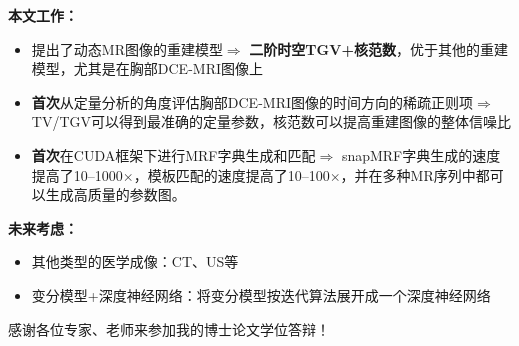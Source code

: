 \documentclass{beamer}
\begin{document}
\begin{frame}
\end{frame}

\begin{frame}
	\textbf{本文工作：}
	\begin{itemize}
		\item 提出了动态MR图像的重建模型$\Rightarrow$ \textbf{二阶时空TGV+核范数}，优于其他的重建模型，尤其是在胸部DCE-MRI图像上
		\item \textbf{首次}从定量分析的角度评估胸部DCE-MRI图像的时间方向的稀疏正则项$\Rightarrow$ TV/TGV可以得到最准确的定量参数，核范数可以提高重建图像的整体信噪比
		\item \textbf{首次}在CUDA框架下进行MRF字典生成和匹配$\Rightarrow$ snapMRF字典生成的速度提高了10--1000$\times$，模板匹配的速度提高了10--100$\times$，并在多种MR序列中都可以生成高质量的参数图。
	\end{itemize}
	
	\textbf{未来考虑：}
	\begin{itemize}
		\item 其他类型的医学成像：CT、US等
		\item 变分模型+深度神经网络：将变分模型按迭代算法展开成一个深度神经网络
	\end{itemize}
\end{frame}



\begin{frame}
\centerline{感谢各位专家、老师来参加我的博士论文学位答辩！}
\end{frame}

\end{document}
